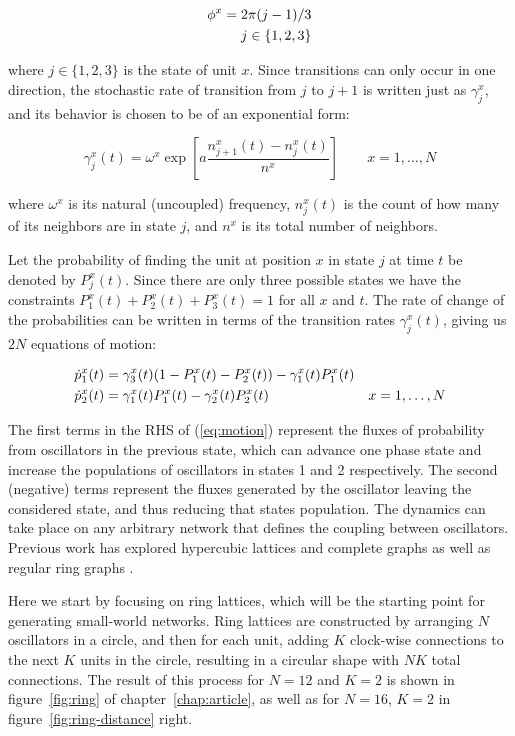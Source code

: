 \begin{align}
  \phi^x = 2\pi (j-1)/3 \\
  j \in \{1,2,3\} \notag
\end{align}

\noindent where $j\in\{1,2,3\}$ is the state of unit $x$. Since transitions can only occur in one direction, the stochastic rate of
transition from $j$ to $j+1$ is written just as $\gamma^x_j$, and its behavior is chosen to be of an exponential form:

\begin{equation}
  \gamma^x_j(t) = \omega^x\exp\left[ a\frac{n^x_{j+1}(t) - n^x_j(t)}{n^x} \right] \qquad x=1,\dots, N
  \label{eq:rate}
\end{equation}

\noindent where $\omega^x$ is its natural (uncoupled) frequency, $n^x_j(t)$ is the count of how many of its neighbors are in state $j$,
and $n^x$ is its total number of neighbors.

Let the probability of finding the unit at position $x$ in state $j$ at time $t$ be denoted by $P_j^x(t)$. Since there are only three
possible states we have the constraints $P_1^x(t)+P_2^x(t)+P_3^x(t)=1$ for all $x$ and $t$. The rate of change of the probabilities can
be written in terms of the transition rates $\gamma^x_j(t)$, giving us $2N$ equations of motion:

\begin{align}
  \dot{p}^x_1(t) &= \gamma^x_3(t)(1 - P_1^x(t) - P_2^x(t)) - \gamma^x_1(t) P_1^x(t) & \notag\\
  \dot{p}^x_2(t) &= \gamma^x_1(t)P_1^x(t) - \gamma^x_2(t) P_2^x(t) &x=1,\dots,N
  \label{eq:motion}
\end{align}

\noindent The first terms in the RHS of (\ref{eq:motion}) represent the fluxes of probability from oscillators in the previous state,
which can advance one phase state and increase the populations of oscillators in states 1 and 2 respectively. The second (negative)
terms represent the fluxes generated by the oscillator leaving the considered state, and thus reducing that states population. The
dynamics can take place on any arbitrary network that defines the coupling between oscillators. Previous work has explored hypercubic
lattices and complete graphs as well as regular ring graphs \cite{Wood06a,assis2011infinite,escaff2014arrays}.

Here we start by focusing on ring lattices, which will be the starting point for generating small-world networks. Ring lattices are
constructed by arranging $N$ oscillators in a circle, and then for each unit, adding $K$ clock-wise connections to the next $K$ units
in the circle, resulting in a circular shape with $NK$ total connections. The result of this process for $N=12$ and $K=2$ is shown in
figure~\ref{fig:ring} of chapter~\ref{chap:article}, as well as for $N=16$, $K=2$ in figure~\ref{fig:ring-distance} right.

